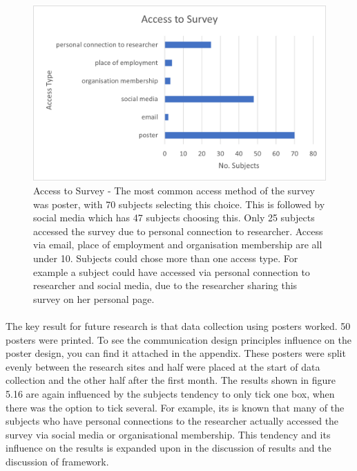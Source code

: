 \begin{figure}[h!]
    \centering
    \includegraphics{fig_results/access_survey.png}
    \caption{Access to Survey - The most common access method of the survey was poster, with 70 subjects selecting this choice. This is followed by social media which has 47 subjects choosing this. Only 25 subjects accessed the survey due to personal connection to researcher. Access via email, place of employment and organisation membership are all under 10. Subjects could chose more than one access type. For example a subject could have accessed via personal connection to researcher and social media, due to the researcher sharing this survey on her personal page. }
    \label{fig:my_label}
\end{figure}
\paragraph{}

The key result for future research is that data collection using posters worked. 50 posters were printed. To see the communication design principles influence on the poster design, you can find it attached in the appendix. These posters were split evenly between the research sites and half were placed at the start of data collection and the other half after the first month. The results shown in figure 5.16 are again influenced by the subjects tendency to only tick one box, when there was the option to tick several. For example, its is known that many of the subjects who have personal connections to the researcher actually accessed the survey via social media or organisational membership. This tendency and its influence on the results is expanded upon in the discussion of results and the discussion of framework. 
\paragraph{}

